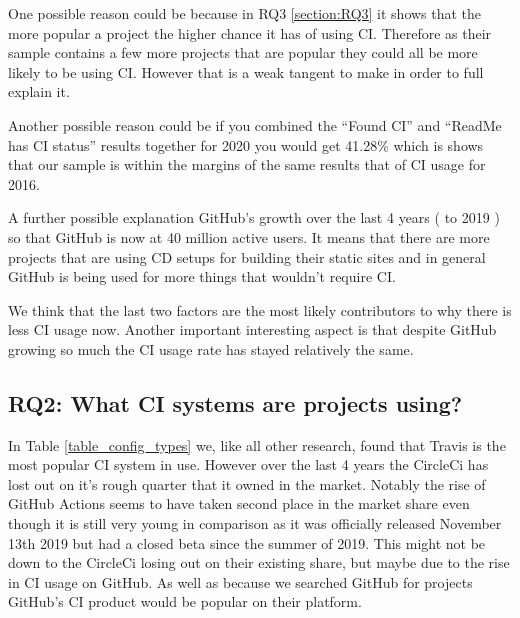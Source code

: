 \documentclass[10pt,conference]{IEEEtran}
\begin{document}
One possible reason could be because in RQ3 \ref{section:RQ3} it shows that the more popular a project the higher chance it has of using CI. Therefore as their sample contains a few more projects that are popular they could all be more likely to be using CI. However that is a weak tangent to make in order to full explain it.  

Another possible reason could be if you combined the \enquote{Found CI} and \enquote{ReadMe has CI status} results together for 2020 you would get 41.28\% which is shows that our sample is within the margins of the same results that of CI usage for 2016.

A further possible explanation GitHub's growth over the last 4 years (\citet{GithubOctoverseResults2016} to 2019 \citet{GithubOctoverseResults}) so that GitHub is now at 40 million active users. It means that there are more projects that are using CD setups for building their static sites and in general GitHub is being used for more things that wouldn't require CI.

We think that the last two factors are the most likely contributors to why there is less CI usage now. Another important interesting aspect is that despite GitHub growing so much the CI usage rate has stayed relatively the same. 




\vspace*{-0.05in}
\subsection{\textbf{RQ2}: What CI systems are projects using?}
\label{section:RQ2}
\vspace*{-0.05in}
In Table \ref{table_config_types} we, like all other research, found that Travis is the most popular CI system in use. However over the last 4 years the \cite{Github2017} CircleCi has lost out on it's rough quarter that it owned in the market. Notably the rise of GitHub Actions seems to have taken second place in the market share even though it is still very young in comparison as it was officially released November 13th 2019 but had a closed beta since the summer of 2019. This might not be down to the CircleCi losing out on their existing share, but maybe due to the rise in CI usage on GitHub. As well as because we searched GitHub for projects GitHub's CI product would be popular on their platform.
\end{document}
